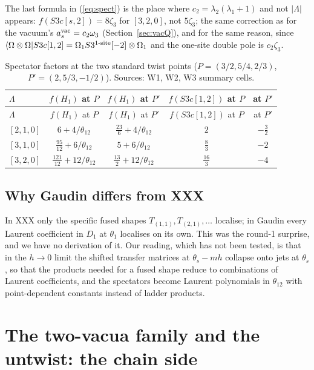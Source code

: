 \documentclass[11pt]{article}
\begin{document}
The last formula in (\ref{eq:spect}) is the place where $c_2=\lambda_2(\lambda_1+1)$ and not $|\Lambda|$ appears: $f(S3c[s,2])=8\zeta_3$ for $[3,2,0]$, not $5\zeta_3$; the same correction as for the vacuum's $a^{\rm vac}_s=c_2\omega_3$ (Section~\ref{sec:vacQ}), and for the same reason, since $\langle\Omega\otimes\Omega|S3c[1,2]=\Omega_1S3^{\rm 1\text{-}site}[-2]\otimes\Omega_1$ and the one-site double pole is $c_2\zeta_3$.

{\small
\begin{longtable}{lcccc}
\caption{Spectator factors at the two standard twist points ($P=(3/2,5/4,2/3)$, $P'=(2,5/3,-1/2)$).
Sources: W1, W2, W3 summary cells.}\label{tab:spect}\\
\toprule
$\Lambda$ & $f(H_1)$ at $P$ & $f(H_1)$ at $P'$ & $f(S3c[1,2])$ at $P$ & at $P'$ \\
\midrule
\endfirsthead
\toprule
$\Lambda$ & $f(H_1)$ at $P$ & $f(H_1)$ at $P'$ & $f(S3c[1,2])$ at $P$ & at $P'$ \\
\midrule
\endhead
\bottomrule
\endlastfoot
$[2,1,0]$ & $6+4/\theta_{12}$ & $\tfrac{23}6+4/\theta_{12}$ & $2$ & $-\tfrac32$ \\
$[3,1,0]$ & $\tfrac{95}{12}+6/\theta_{12}$ & $5+6/\theta_{12}$ & $\tfrac83$ & $-2$ \\
$[3,2,0]$ & $\tfrac{121}{12}+12/\theta_{12}$ & $\tfrac{13}2+12/\theta_{12}$ & $\tfrac{16}3$ & $-4$ \\
\end{longtable}}


\subsection{Why Gaudin differs from XXX}\label{sec:whydiff}

In XXX only the specific fused shapes $T_{(1,1)},T_{(2,1)},\dots$ localise; in Gaudin every Laurent coefficient in $D_1$ at $\theta_1$ localises on its own.
This was the round-1 surprise, and we have no derivation of it.
Our reading, which has not been tested, is that in the $h\to0$ limit the shifted transfer matrices at $\theta_s-mh$ collapse onto jets at $\theta_s$, so that the products needed for a fused shape reduce to combinations of Laurent coefficients, and the spectators become Laurent polynomials in $\theta_{12}$ with point-dependent constants instead of ladder products.

\section{The two-vacua family and the untwist: the chain side}\label{sec:chain}
\end{document}
